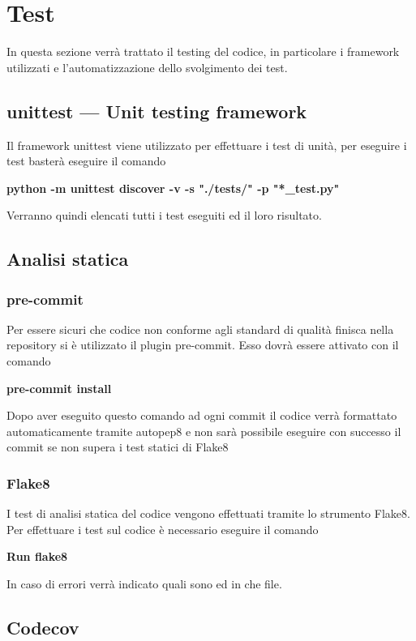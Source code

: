\section{Test}

In questa sezione verrà trattato il testing del codice, in particolare i framework utilizzati e l'automatizzazione dello svolgimento dei test.

\subsection{unittest — Unit testing framework}

Il framework unittest viene utilizzato per effettuare i test di unità, per eseguire i test basterà eseguire il comando 

\centerline{ \textbf{python -m unittest discover -v -s "./tests/" -p "*\_test.py"}}

Verranno quindi elencati tutti i test eseguiti ed il loro risultato.


\subsection{Analisi statica}

\subsubsection{pre-commit}

Per essere sicuri che codice non conforme agli standard di qualità finisca nella repository si è utilizzato il plugin pre-commit. Esso dovrà essere attivato con il comando

\centerline{\textbf{pre-commit install}}

Dopo aver eseguito questo comando ad ogni commit il codice verrà formattato automaticamente tramite autopep8 e non sarà possibile eseguire con successo il commit se non supera i test statici di Flake8

\subsubsection{Flake8}

I test di analisi statica del codice vengono effettuati tramite lo strumento Flake8. Per effettuare i test sul codice è necessario eseguire il comando

\centerline{\textbf{Run flake8}}
In caso di errori verrà indicato quali sono ed in che file. 

\subsection{Codecov}

